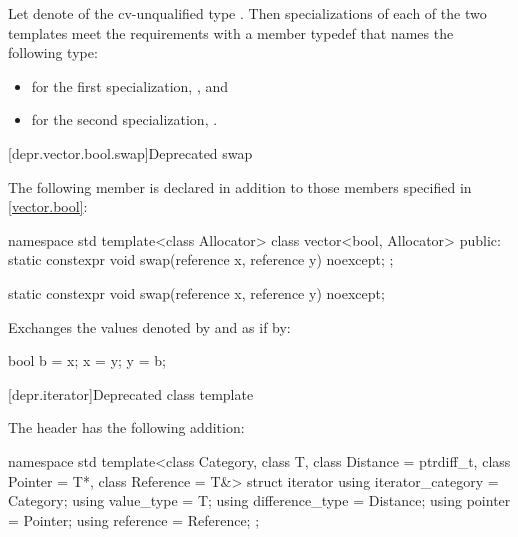 \begin{itemdescr}
\pnum
Let  denote 
of the cv-unqualified type .
Then specializations of each of the two templates meet
the  requirements
with a member typedef  that names the following type:
\begin{itemize}
\item for the first specialization, , and
\item for the second specialization, .
\end{itemize}
\end{itemdescr}

[depr.vector.bool.swap]{Deprecated  swap}

\pnum
The following member is declared in addition to those members specified in
\ref{vector.bool}:

\begin{codeblock}
namespace std {
  template<class Allocator> class vector<bool, Allocator> {
  public:
    static constexpr void swap(reference x, reference y) noexcept;
  };
}
\end{codeblock}

%
\begin{itemdecl}
static constexpr void swap(reference x, reference y) noexcept;
\end{itemdecl}

\begin{itemdescr}
\pnum
\effects
Exchanges the values denoted by  and  as if by:
\begin{codeblock}
bool b = x;
x = y;
y = b;
\end{codeblock}
\end{itemdescr}

[depr.iterator]{Deprecated  class template}

\pnum
The header  has the following addition:

%
\begin{codeblock}
namespace std {
  template<class Category, class T, class Distance = ptrdiff_t,
           class Pointer = T*, class Reference = T&>
  struct iterator {
    using iterator_category = Category;
    using value_type        = T;
    using difference_type   = Distance;
    using pointer           = Pointer;
    using reference         = Reference;
  };
}
\end{codeblock}

